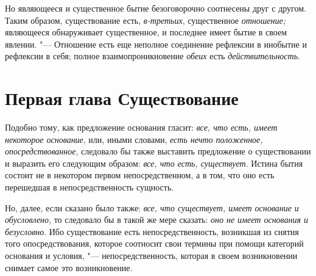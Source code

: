 Но являющееся и существенное бытие безоговорочно соотнесены друг с другом.
Таким образом, существование есть, {\em в-третьих},
существенное {\em отношение;} являющееся обнаруживает
существенное, и последнее имеет бытие в своем явлении. "--- Отношение есть еще
неполное соединение рефлексии в инобытие и рефлексии в себя; полное
взаимопроникновение {\em обеих} есть {\em действительность}.

\chapter[{\em Первая глава} Существование]{Первая глава Существование}

Подобно тому, как предложение основания гласит:
{\em все, что есть, имеет некоторое основание}, или,
иными словами, {\em есть нечто положенное,
опосредствованное}, следовало бы также выставить предложение о
существовании и выразить его следующим образом:
{\em все, что есть, существует}. Истина бытия состоит
не в некотором первом непосредственном, а в том, что оно есть перешедшая в
непосредственность сущность.

Но, далее, если сказано было также: {\em все, что
существует, имеет основание и обусловлено}, то следовало бы в такой же мере
сказать: {\em оно не имеет основания и безусловно}. Ибо
существование есть непосредственность, возникшая из снятия того
опосредствования, которое соотносит свои термины при помощи категорий
основания и условия, "--- непосредственность, которая в своем возникновении
снимает самое это возникновение.

